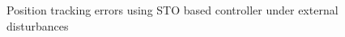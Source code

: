 \documentclass[letterpaper%
, twoside%
, 12pt%
,memoire%
, english%
,creativecommons,hyperref%
]{thETS}
\theoremstyle{newThmStyle}
\begin{document}
\begin{figure}[H]
	\centering
	\parbox{0.75\textwidth}{\caption{Position tracking errors using STO based controller under external disturbances\label{Fig:xyzerrSTODist}}}
\end{figure}
\end{document}
